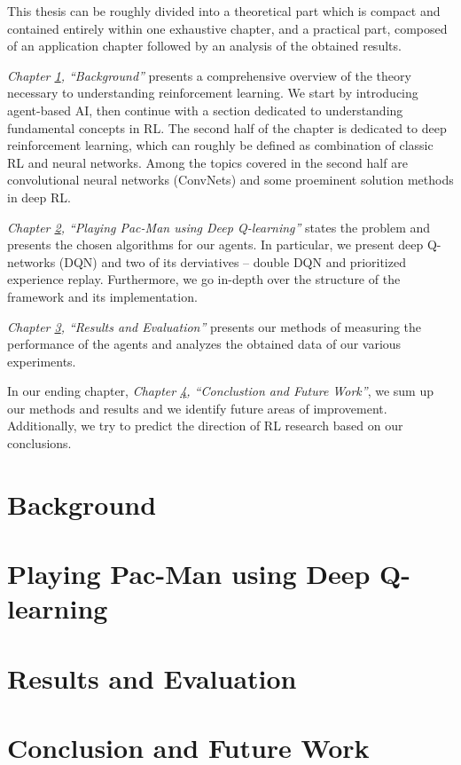 \documentclass[12pt,twoside]{report}
\begin{document}
This thesis can be roughly divided into a theoretical part which is compact and contained entirely within one exhaustive chapter, and a practical part, composed of an application chapter followed by an analysis of the obtained results.

\emph{Chapter \ref{chapter:background}, ``Background''} presents a comprehensive overview of the theory necessary to understanding reinforcement learning.
We start by introducing agent-based AI, then continue with a
section dedicated to understanding fundamental concepts in RL.
The second half of the chapter is dedicated to deep reinforcement learning, which can roughly be defined as combination of classic RL and neural networks.
Among the topics covered in the second half are convolutional neural networks (ConvNets) and some proeminent solution methods in deep RL.

\emph{Chapter \ref{chapter:practical}, ``Playing Pac-Man using Deep Q-learning''} states the problem and presents the chosen algorithms for our agents.
In particular, we present deep Q-networks (DQN) and two of its derviatives -- double DQN and prioritized experience replay.
Furthermore, we go in-depth over the structure of the framework and its implementation.

\emph{Chapter \ref{chapter:results}, ``Results and Evaluation''} presents our methods of measuring the performance of the agents and analyzes the obtained data of our various experiments.

In our ending chapter, \emph{Chapter \ref{chapter:conclusion}, ``Conclustion and Future Work''}, we sum up our methods and results and we identify future areas of improvement. Additionally, we try to predict the direction of RL research based on our conclusions.

\chapter{Background} \label{chapter:background}


\chapter{Playing Pac-Man using Deep Q-learning} \label{chapter:practical}


\chapter{Results and Evaluation} \label{chapter:results}


\chapter{Conclusion and Future Work} \label{chapter:conclusion}



\end{document}
